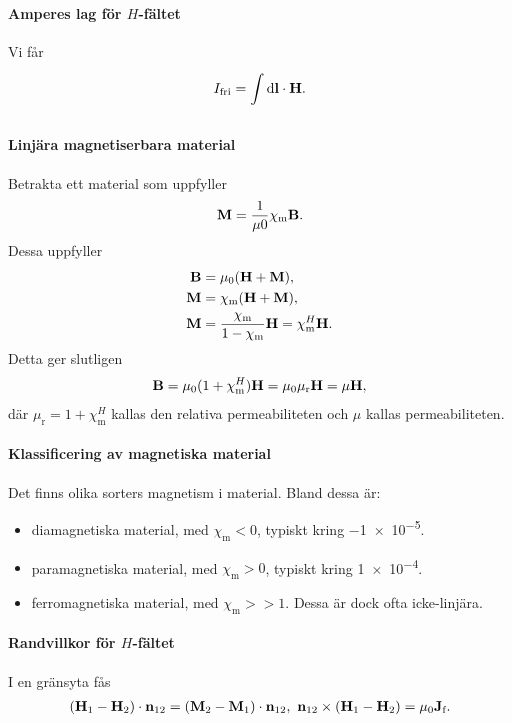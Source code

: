 \paragraph{Amperes lag för $H$-fältet}
Vi får
\begin{align*}
	I_{\text{fri}} = \int\limits_{}^{}\dd{\vb{l}}\cdot \vb{H}.
\end{align*}

\paragraph{Linjära magnetiserbara material}
Betrakta ett material som uppfyller
\begin{align*}
	\vb{M} = \frac{1}{\mu{0}}\chi_{\text{m}}\vb{B}.
\end{align*}
Dessa uppfyller
\begin{align*}
	\vb{B} &= \mu_{0}(\vb{H} + \vb{M}), \\
	\vb{M} &= \chi_{\text{m}}(\vb{H} + \vb{M}), \\
	\vb{M} &= \frac{\chi_{\text{m}}}{1 - \chi_{\text{m}}}\vb{H} = \chi_{\text{m}}^{H}\vb{H}.
\end{align*}
Detta ger slutligen
\begin{align*}
	\vb{B} = \mu_{0}(1 + \chi_{\text{m}}^{H})\vb{H} = \mu_{0}\mu_{\text{r}}\vb{H} = \mu\vb{H},
\end{align*}
där $\mu_{\text{r}} = 1 + \chi_{\text{m}}^{H}$ kallas den relativa permeabiliteten och $\mu$ kallas permeabiliteten.

\paragraph{Klassificering av magnetiska material}
Det finns olika sorters magnetism i material. Bland dessa är:
\begin{itemize}
	\item diamagnetiska material, med $\chi_{\text{m}} < 0$, typiskt kring \num{-1e-5}.
	\item paramagnetiska material, med $\chi_{\text{m}} > 0$, typiskt kring \num{1e-4}.
	\item ferromagnetiska material, med $\chi_{\text{m}} >> 1$. Dessa är dock ofta icke-linjära.
\end{itemize}

\paragraph{Randvillkor för $H$-fältet}
I en gränsyta fås
\begin{align*}
	(\vb{H}_{1} - \vb{H}_{2})\cdot\vb{n}_{12} = (\vb{M}_{2} - \vb{M}_{1})\cdot\vb{n}_{12},\ \vb{n}_{12}\times(\vb{H}_{1} - \vb{H}_{2}) = \mu_{0}\vb{J}_{\text{f}}.
\end{align*}

